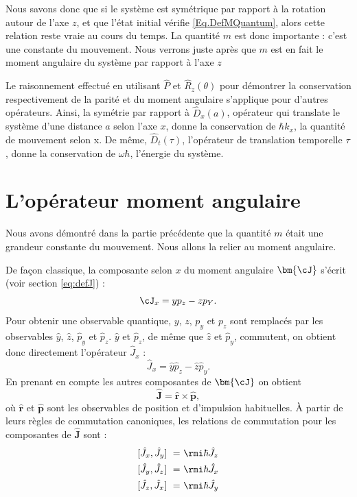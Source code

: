 Nous savons donc que si le système est symétrique par rapport à la rotation autour de l'axe $z$, et que l'état initial vérifie \ref{Eq.DefMQuantum}, alors cette relation reste vraie au cours du temps. La quantité $m$ est donc importante : c'est une constante du mouvement. Nous verrons juste après que $m$ est en fait le moment angulaire du système par rapport à l'axe $z$

Le raisonnement effectué en utilisant $\hat{P}$ et $\hat{R}_z(\theta)$ pour démontrer la conservation respectivement de la parité et du moment angulaire s'applique pour d'autres opérateurs. Ainsi, la symétrie par rapport à $\hat{D}_x(a)$, opérateur qui translate le système d'une distance $a$ selon l'axe $x$, donne la conservation de $\hbar k_x$, la quantité de mouvement selon x. De même, $\hat{D}_t(\tau)$, l'opérateur de translation temporelle $\tau$, donne la conservation de $\omega \hbar$, l'énergie du système.

\section{L'opérateur moment angulaire}
Nous avons démontré dans la partie précédente que la quantité $m$ était une grandeur constante du mouvement. Nous allons la relier au moment angulaire.

De façon classique, la composante selon $x$ du moment angulaire $\bm{\cJ}$ s'écrit (voir section \ref{eq:defJ}) :
\begin{equation*}
\cJ_x=yp_z-zp_Y.
\end{equation*}
Pour obtenir une observable quantique, $y$, $z$, $p_y$ et $p_z$ sont remplacés par les observables $\hat{y}$, $\hat{z}$, $\hat{p}_y$ et $\hat{p}_z$. $\hat{y}$ et $\hat{p}_z$, de même que $\hat{z}$ et $\hat{p}_y$, commutent, on obtient donc directement l'opérateur $\hat{J}_x$ :
\begin{equation*}
\hat{J}_x=\hat{y}\hat{p}_z-\hat{z}\hat{p}_y.
\end{equation*}
En prenant en compte les autres composantes de $\bm{\cJ}$ on obtient 
\begin{equation*}
\bm{\hat{J}}=\bm{\hat{r}}\times\bm{\hat{p}},
\end{equation*}
où $\bm{\hat{r}}$ et $\bm{\hat{p}}$ sont les observables de position et d'impulsion habituelles. \`A partir de leurs règles de commutation canoniques, les relations de commutation pour les composantes de $\bm{\hat{J}}$ sont :
\begin{equation}
\begin{alignedat}{6}
&[\hat{J}_x,\hat{J}_y&&]~&&=~&&\rmi\hbar &&\hat{J}_z&&\\
&[\hat{J}_y,\hat{J}_z&&]~&&=~&&\rmi\hbar &&\hat{J}_x&&\\
&[\hat{J}_z,\hat{J}_x&&]~&&=~&&\rmi\hbar &&\hat{J}_y&&
\end{alignedat}
\label{Eq.CommutJ}
\end{equation}


